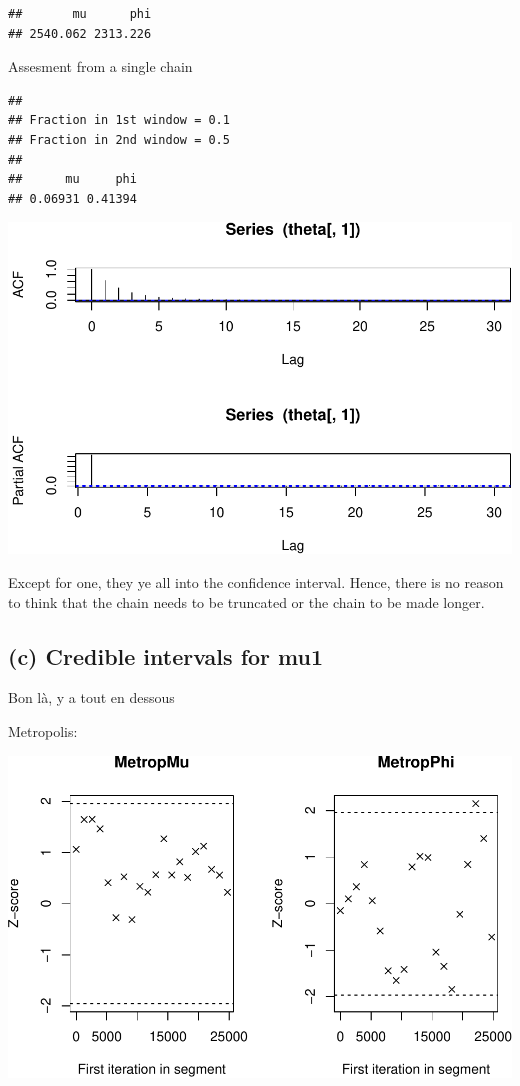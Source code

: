 \documentclass[a4paper, 12pt]{article}
\begin{document}
\begin{verbatim}
##       mu      phi 
## 2540.062 2313.226
\end{verbatim}

    Assesment from a single chain

\begin{verbatim}
## 
## Fraction in 1st window = 0.1
## Fraction in 2nd window = 0.5 
## 
##      mu     phi 
## 0.06931 0.41394
\end{verbatim}

    \begin{center}\includegraphics[width=0.8\linewidth]{resources/figs/unnamed-chunk-16-1} \end{center}

    Except for one, they ye all into the confidence interval. Hence,
    there is no reason to think that the chain needs to be truncated or
    the chain to be made longer.

    \hypertarget{c-credible-intervals-for-mu1}{%
    \subsection{(c) Credible intervals for
    mu1}\label{c-credible-intervals-for-mu1}}

    Bon là, y a tout en dessous

    Metropolis:

    \begin{center}\includegraphics[width=0.8\linewidth]{resources/figs/unnamed-chunk-17-1} \end{center}
\end{document}
